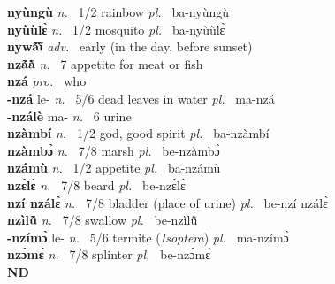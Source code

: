 {\bfseries nyùngù}  {\itshape n.~} 1/2 rainbow {\itshape pl.~} ba-nyùngù    \\ 
{\bfseries nyùùlɛ̀}  {\itshape n.~} 1/2 mosquito {\itshape pl.~} ba-nyùùlɛ̀    \\ 
{\bfseries nywã́ĩ̀}  {\itshape adv.~} early (in the day, before sunset)    \\ 
{\bfseries nzã́ã̀}  {\itshape n.~} 7 appetite for meat or fish    \\ 
{\bfseries nzá}  {\itshape pro.~} who    \\ 
{\bfseries -nzá} le- {\itshape n.~} 5/6 dead leaves in water {\itshape pl.~} ma-nzá    \\ 
{\bfseries -nzálè} ma- {\itshape n.~} 6 urine    \\ 
{\bfseries nzàmbí}  {\itshape n.~} 1/2 god, good spirit {\itshape pl.~} ba-nzàmbí    \\ 
{\bfseries nzàmbɔ̀}  {\itshape n.~} 7/8 marsh {\itshape pl.~} be-nzàmbɔ̀    \\ 
{\bfseries nzámù}  {\itshape n.~} 1/2 appetite {\itshape pl.~} ba-nzámù    \\ 
{\bfseries nzɛ̀lɛ̀}  {\itshape n.~} 7/8 beard {\itshape pl.~} be-nzɛ̀lɛ̀    \\ 
{\bfseries nzí nzálɛ̀}  {\itshape n.~} 7/8 bladder (place of urine) {\itshape pl.~} be-nzí nzálɛ̀    \\ 
{\bfseries nzìlũ̂}  {\itshape n.~} 7/8 swallow {\itshape pl.~} be-nzìlũ̂    \\ 
{\bfseries -nzímɔ̀} le- {\itshape n.~} 5/6 termite ({\itshape Isoptera}) {\itshape pl.~} ma-nzímɔ̀    \\ 
{\bfseries nzɔ̀mɛ́}  {\itshape n.~} 7/8 splinter {\itshape pl.~} be-nzɔ̀mɛ́    \\ 

\medskip
\noindent \large {\bfseries ND}\normalsize\\
\medskip

